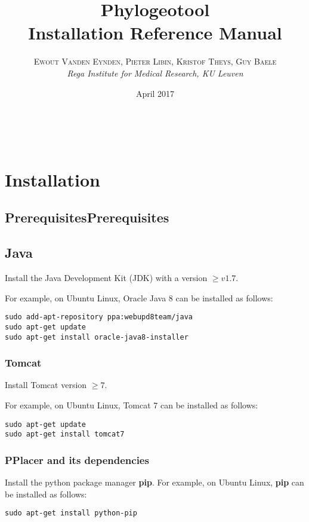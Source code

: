 \documentclass[a4paper, 11pt]{article} %
\title{\textbf{Phylogeotool}\\ %
Installation Reference Manual} %
\author{\textsc{Ewout Vanden Eynden, Pieter Libin, Kristof Theys, Guy Baele} %
\\{\textit{Rega Institute for Medical Research, KU Leuven}}} %
\date{April 2017} %
\makeatletter
\renewcommand{\maketitle}{ %
\begin{flushright} %
{\LARGE\@title} %

\vspace{50pt} %

{\large\@author} %
\\\@date %

\vspace{40pt} %
\end{flushright}
}
\makeatother
\begin{document}
\maketitle %

\vspace{30pt} %

\tableofcontents
\newpage

\section{Installation}
\subsection{PrerequisitesPrerequisites}
\subsection*{Java}
Install the Java Development Kit (JDK) with a version $\geq v 1.7$.

For example, on Ubuntu Linux, Oracle Java 8 can be installed as follows:
\begin{verbatim} 
sudo add-apt-repository ppa:webupd8team/java
sudo apt-get update
sudo apt-get install oracle-java8-installer
\end{verbatim}

\subsubsection*{Tomcat}
Install Tomcat version $\geq 7$.

For example, on Ubuntu Linux, Tomcat 7 can be installed as follows:
\begin{verbatim}
sudo apt-get update
sudo apt-get install tomcat7
\end{verbatim}


\subsubsection{PPlacer and its dependencies}
Install the python package manager \textbf{pip}. For example, on Ubuntu Linux, \textbf{pip} can be installed as follows:
\begin{verbatim}
sudo apt-get install python-pip
\end{verbatim}
\end{document}
